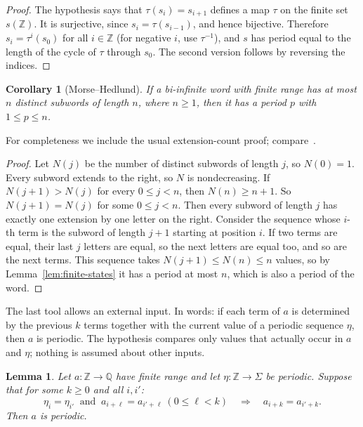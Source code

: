 \documentclass[11pt,a4paper,reqno]{amsart}
\newtheorem{lemma}[theorem]{Lemma}
\newtheorem{corollary}[theorem]{Corollary}
\theoremstyle{definition}
\theoremstyle{remark}
\newcommand{\Z}{\mathbb Z}
\newcommand{\Q}{\mathbb Q}
\numberwithin{equation}{section}
\begin{document}
\begin{proof}
The hypothesis says that $\tau(s_i)=s_{i+1}$ defines a map $\tau$ on the finite set $s(\Z)$. It is surjective, since $s_i=\tau(s_{i-1})$, and hence bijective. Therefore $s_i=\tau^i(s_0)$ for all $i\in\Z$ (for negative $i$, use $\tau^{-1}$), and $s$ has period equal to the length of the cycle of $\tau$ through $s_0$. The second version follows by reversing the indices.
\end{proof}

\begin{corollary}[Morse--Hedlund]\label{cor:morse}
If a bi-infinite word with finite range has at most $n$ distinct subwords of length $n$, where $n\ge1$, then it has a period $p$ with $1\le p\le n$.
\end{corollary}

For completeness we include the usual extension-count proof; compare~\cite[Section~2.1]{CK}.

\begin{proof}
Let $N(j)$ be the number of distinct subwords of length $j$, so $N(0)=1$. Every subword extends to the right, so $N$ is nondecreasing. If $N(j+1)>N(j)$ for every $0\le j<n$, then $N(n)\ge n+1$. So $N(j+1)=N(j)$ for some $0\le j<n$. Then every subword of length $j$ has exactly one extension by one letter on the right. Consider the sequence whose $i$-th term is the subword of length $j+1$ starting at position $i$. If two terms are equal, their last $j$ letters are equal, so the next letters are equal too, and so are the next terms. This sequence takes $N(j+1)\le N(n)\le n$ values, so by Lemma~\ref{lem:finite-states} it has a period at most $n$, which is also a period of the word.
\end{proof}

The last tool allows an external input. In words: if each term of $a$ is determined by the previous $k$ terms together with the current value of a periodic sequence $\eta$, then $a$ is periodic. The hypothesis compares only values that actually occur in $a$ and $\eta$; nothing is assumed about other inputs.

\begin{lemma}\label{lem:forcing}
Let $a\colon\Z\to\Q$ have finite range and let $\eta\colon\Z\to\Sigma$ be periodic. Suppose that for some $k\ge0$ and all $i,i'$:
\[
 \eta_i=\eta_{i'}\ \text{ and }\ a_{i+\ell}=a_{i'+\ell}\ (0\le\ell<k)\quad\Longrightarrow\quad a_{i+k}=a_{i'+k}.
\]
Then $a$ is periodic.
\end{lemma}
\end{document}
